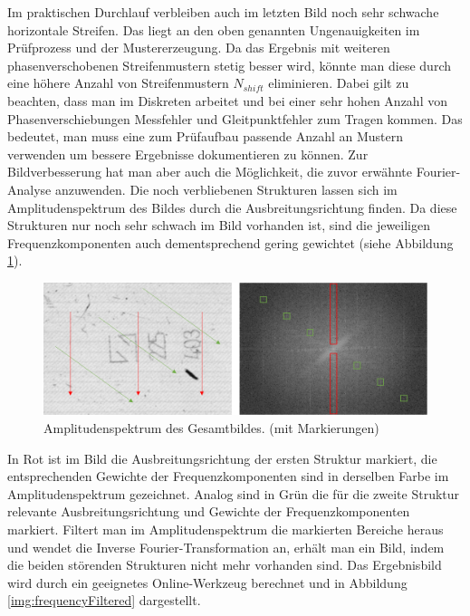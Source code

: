 \noindent
Im praktischen Durchlauf verbleiben auch im letzten Bild noch sehr schwache horizontale Streifen.
Das liegt an den oben genannten Ungenauigkeiten im Prüfprozess und der Mustererzeugung.
Da das Ergebnis mit weiteren phasenverschobenen Streifenmustern stetig besser wird, könnte man diese durch eine höhere Anzahl von Streifenmustern $N_{shift}$ eliminieren.
Dabei gilt zu beachten, dass man im Diskreten arbeitet und bei einer sehr hohen Anzahl von Phasenverschiebungen Messfehler und Gleitpunktfehler zum Tragen kommen.
Das bedeutet, man muss eine zum Prüfaufbau passende Anzahl an Mustern verwenden um bessere Ergebnisse dokumentieren zu können.
Zur Bildverbesserung hat man aber auch die Möglichkeit, die zuvor erwähnte Fourier-Analyse anzuwenden.
Die noch verbliebenen Strukturen lassen sich im Amplitudenspektrum des Bildes durch die Ausbreitungsrichtung finden.
Da diese Strukturen nur noch sehr schwach im Bild vorhanden ist, sind die jeweiligen Frequenzkomponenten auch dementsprechend gering gewichtet (siehe Abbildung \ref{img:amplitudeSpectrum}).

\begin{figure}[H]
	\centering
	\includegraphics[width=\textwidth]{03_sichtpruefungDurchLichtstreuung/optimierungen/figures/amplitudeSpectrum}
	\caption[Amplitudenspektrum des Gesamtbildes]{Amplitudenspektrum des Gesamtbildes. (mit Markierungen)}
	\label{img:amplitudeSpectrum}
\end{figure}

\noindent
In Rot ist im Bild die Ausbreitungsrichtung der ersten Struktur markiert, die entsprechenden Gewichte der Frequenzkomponenten sind in derselben Farbe im Amplitudenspektrum gezeichnet.
Analog sind in Grün die für die zweite Struktur relevante Ausbreitungsrichtung und Gewichte der Frequenzkomponenten markiert.
Filtert man im Amplitudenspektrum die markierten Bereiche heraus und wendet die Inverse Fourier-Transformation an, erhält man ein Bild, indem die beiden störenden Strukturen nicht mehr vorhanden sind.
Das Ergebnisbild wird durch ein geeignetes Online-Werkzeug \cite{fourierTool} berechnet und in Abbildung \ref{img:frequencyFiltered} dargestellt.

